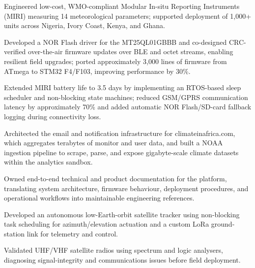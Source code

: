 
\begin{details}
    \item Engineered low-cost, WMO-compliant Modular In-situ Reporting Instruments (MIRI) measuring 14 meteorological parameters; supported deployment of 1{,}000+ units across Nigeria, Ivory Coast, Kenya, and Ghana.
    \item Developed a NOR Flash driver for the MT25QL01GBBB and co-designed CRC-verified over-the-air firmware updates over BLE and octet streams, enabling resilient field upgrades; ported approximately 3{,}000 lines of firmware from ATmega to STM32 F4/F103, improving performance by 30\%.
    \item Extended MIRI battery life to 3.5 days by implementing an RTOS-based sleep scheduler and non-blocking state machines; reduced GSM/GPRS communication latency by approximately 70\% and added automatic NOR Flash/SD-card fallback logging during connectivity loss.
    \item Architected the email and notification infrastructure for climateinafrica.com, which aggregates terabytes of monitor and user data, and built a NOAA ingestion pipeline to scrape, parse, and expose gigabyte-scale climate datasets within the analytics sandbox.
    \item Owned end-to-end technical and product documentation for the platform, translating system architecture, firmware behaviour, deployment procedures, and operational workflows into maintainable engineering references.
    \item Developed an autonomous low-Earth-orbit satellite tracker using non-blocking task scheduling for azimuth/elevation actuation and a custom LoRa ground-station link for telemetry and control.
    \item Validated UHF/VHF satellite radios using spectrum and logic analysers, diagnosing signal-integrity and communications issues before field deployment.
\end{details}

